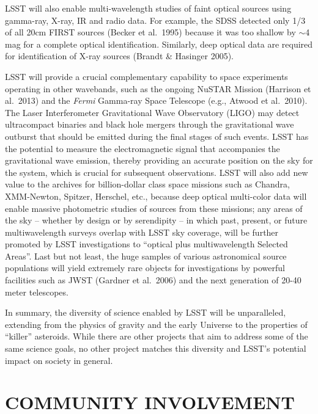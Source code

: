 \documentclass{emulateapj}
\begin{document}
LSST will also enable multi-wavelength studies of faint optical
sources using gamma-ray, X-ray, IR and radio data.  For example, the
SDSS detected only 1/3 of all 20cm FIRST sources (Becker et al.~1995)
because it was too shallow by $\sim$4 mag for a complete optical
identification. Similarly, deep optical data are required for
identification of X-ray sources (Brandt \& Hasinger 2005).

LSST will provide a crucial complementary capability to space 
experiments operating in other wavebands, such as the ongoing
NuSTAR Mission (Harrison et al.~2013)
and the {\it Fermi} 
Gamma-ray Space Telescope (e.g., Atwood et al.~2010). 
The Laser Interferometer Gravitational 
Wave Observatory (LIGO) may detect ultracompact binaries and black hole mergers through the 
gravitational wave outburst that should be emitted during the final stages of such events. 
LSST has the potential to measure the electromagnetic signal that accompanies the gravitational wave emission, 
thereby providing an accurate position on the sky for the system, which is 
crucial for subsequent observations. LSST will also add new value to the archives for 
billion-dollar class space missions such as Chandra, XMM-Newton, Spitzer, Herschel,
etc., because deep optical multi-color data will enable 
massive photometric  studies of sources from these missions;
any areas of the sky -- whether by design or by serendipity -- in which past, present, or future 
multiwavelength surveys overlap with LSST sky coverage, will be further promoted by LSST 
investigations to ``optical plus multiwavelength Selected Areas''.   
Last but not least, the huge samples of various astronomical source
populations will yield extremely rare objects for investigations by powerful
facilities such as JWST (Gardner et al.~2006) and the next generation
of 20-40 meter telescopes.  

In summary, the diversity of science enabled by LSST will be 
unparalleled, extending from the physics of gravity and the
early Universe to the properties of ``killer'' asteroids. While
there are other projects that aim to address some of the same
science goals, no other project matches this diversity and 
LSST's potential impact on society in general. 


\section{   COMMUNITY INVOLVEMENT   }
\label{Sec:community}
\end{document}
